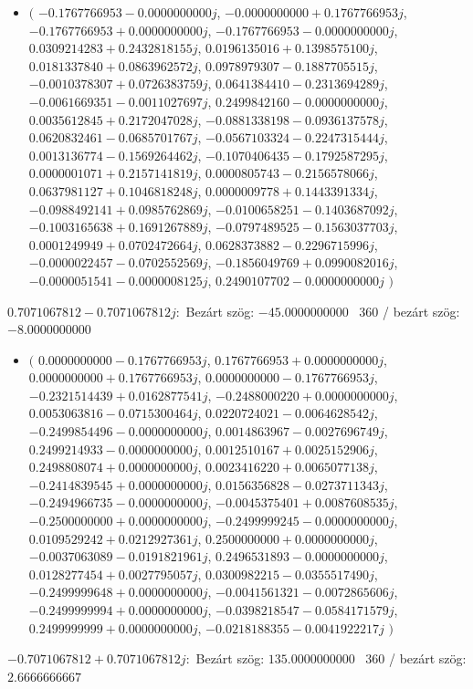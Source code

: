 \documentclass[14pt,a4paper]{article}
\begin{document}
\begin{itemize}
\item
$\big($
$-0.1767766953-0.0000000000j$, $-0.0000000000+0.1767766953j$, $-0.1767766953+0.0000000000j$, $-0.1767766953-0.0000000000j$, $0.0309214283+0.2432818155j$, $0.0196135016+0.1398575100j$, $0.0181337840+0.0863962572j$, $0.0978979307-0.1887705515j$, $-0.0010378307+0.0726383759j$, $0.0641384410-0.2313694289j$, $-0.0061669351-0.0011027697j$, $0.2499842160-0.0000000000j$, $0.0035612845+0.2172047028j$, $-0.0881338198-0.0936137578j$, $0.0620832461-0.0685701767j$, $-0.0567103324-0.2247315444j$, $0.0013136774-0.1569264462j$, $-0.1070406435-0.1792587295j$, $0.0000001071+0.2157141819j$, $0.0000805743-0.2156578066j$, $0.0637981127+0.1046818248j$, $0.0000009778+0.1443391334j$, $-0.0988492141+0.0985762869j$, $-0.0100658251-0.1403687092j$, $-0.1003165638+0.1691267889j$, $-0.0797489525-0.1563037703j$, $0.0001249949+0.0702472664j$, $0.0628373882-0.2296715996j$, $-0.0000022457-0.0702552569j$, $-0.1856049769+0.0990082016j$, $-0.0000051541-0.0000008125j$, $0.2490107702-0.0000000000j$
$\big)$
\end{itemize}
$0.7071067812-0.7071067812j$:\
Bezárt szög: $-45.0000000000$ \
360 / bezárt szög: $-8.0000000000$\
\begin{itemize}
\item
$\big($
$0.0000000000-0.1767766953j$, $0.1767766953+0.0000000000j$, $0.0000000000+0.1767766953j$, $0.0000000000-0.1767766953j$, $-0.2321514439+0.0162877541j$, $-0.2488000220+0.0000000000j$, $0.0053063816-0.0715300464j$, $0.0220724021-0.0064628542j$, $-0.2499854496-0.0000000000j$, $0.0014863967-0.0027696749j$, $0.2499214933-0.0000000000j$, $0.0012510167+0.0025152906j$, $0.2498808074+0.0000000000j$, $0.0023416220+0.0065077138j$, $-0.2414839545+0.0000000000j$, $0.0156356828-0.0273711343j$, $-0.2494966735-0.0000000000j$, $-0.0045375401+0.0087608535j$, $-0.2500000000+0.0000000000j$, $-0.2499999245-0.0000000000j$, $0.0109529242+0.0212927361j$, $0.2500000000+0.0000000000j$, $-0.0037063089-0.0191821961j$, $0.2496531893-0.0000000000j$, $0.0128277454+0.0027795057j$, $0.0300982215-0.0355517490j$, $-0.2499999648+0.0000000000j$, $-0.0041561321-0.0072865606j$, $-0.2499999994+0.0000000000j$, $-0.0398218547-0.0584171579j$, $0.2499999999+0.0000000000j$, $-0.0218188355-0.0041922217j$
$\big)$
\end{itemize}
$-0.7071067812+0.7071067812j$:\
Bezárt szög: $135.0000000000$ \
360 / bezárt szög: $2.6666666667$\
\end{document}
